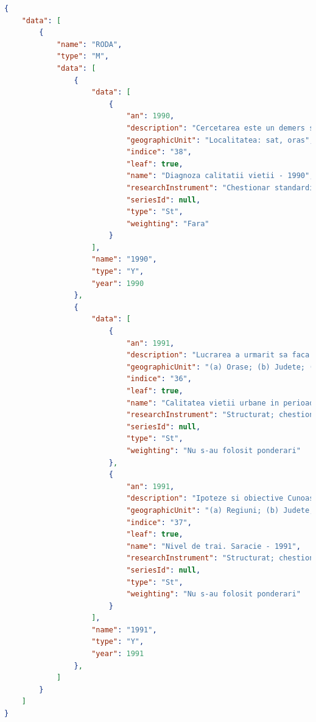 \begin{lstlisting}[language=json]
{
    "data": [
        {
            "name": "RODA",
            "type": "M",
            "data": [
                {
                    "data": [
                        {
                            "an": 1990,
                            "description": "Cercetarea este un demers sistematic de analiza a ...",
                            "geographicUnit": "Localitatea: sat, oras",
                            "indice": "38",
                            "leaf": true,
                            "name": "Diagnoza calitatii vietii - 1990",
                            "researchInstrument": "Chestionar standardizat cu scale de tip Likert pentru perceptii, evaluare, satisfactie.",
                            "seriesId": null,
                            "type": "St",
                            "weighting": "Fara"
                        }
                    ],
                    "name": "1990",
                    "type": "Y",
                    "year": 1990
                },
                {
                    "data": [
                        {
                            "an": 1991,
                            "description": "Lucrarea a urmarit sa faca o comparatie intre calitatea ...",
                            "geographicUnit": "(a) Orase; (b) Judete; (c) Sectii de votare",
                            "indice": "36",
                            "leaf": true,
                            "name": "Calitatea vietii urbane in perioada de tranzitie. Comparativ Romania-Polonia - 1991",
                            "researchInstrument": "Structurat; chestionar cu intrebari inchise si deschise",
                            "seriesId": null,
                            "type": "St",
                            "weighting": "Nu s-au folosit ponderari"
                        },
                        {
                            "an": 1991,
                            "description": "Ipoteze si obiective Cunoasterea dimensiunilor saraciei pe ansamblu...",
                            "geographicUnit": "(a) Regiuni; (b) Judete; (c) Localitati",
                            "indice": "37",
                            "leaf": true,
                            "name": "Nivel de trai. Saracie - 1991",
                            "researchInstrument": "Structurat; chestionar cu intrebari inchise si deschise",
                            "seriesId": null,
                            "type": "St",
                            "weighting": "Nu s-au folosit ponderari"
                        }
                    ],
                    "name": "1991",
                    "type": "Y",
                    "year": 1991
                },
            ]
        }
    ]
}
\end{lstlisting}

